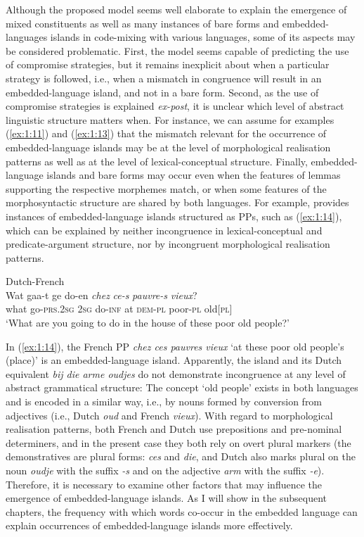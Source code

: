 Although the proposed model seems well elaborate to explain the emergence of mixed constituents as well as many instances of bare forms and embedded-languages islands in code-mixing with various languages, some of its aspects may be considered problematic. First, the model seems capable of predicting the use of compromise strategies, but it remains inexplicit about when a particular strategy is followed, i.e., when a mismatch in congruence will result in an embedded-language island, and not in a bare form. Second, as the use of compromise strategies is explained \textit{ex-post}, it is unclear which level of abstract linguistic structure matters when. For instance, we can assume for examples (\ref{ex:1:11}) and (\ref{ex:1:13}) that the mismatch relevant for the occurrence of embedded-language islands may be at the level of morphological realisation patterns as well as at the level of lexical-conceptual structure. Finally, embedded-language islands and bare forms may occur even when the features of lemmas supporting the respective morphemes match, or when some features of the morphosyntactic structure are shared by both languages. For example, \citet{treffers-daller-mixing-1994} provides instances of embedded-language islands structured as PPs, such as (\ref{ex:1:14}), which can be explained by neither incongruence in lexical-conceptual and predicate-argument structure, nor by incongruent morphological realisation patterns.

\ea \label{ex:1:14}
Dutch-French \citep[208]{treffers-daller-mixing-1994}\\
\gll Wat gaa-t ge do-en \textit{chez} \textit{ce-s} \textit{pauvre-s} \textit{vieux}?\\
	what go-\textsc{prs.2sg} \textsc{2sg} do-\textsc{inf} at \textsc{dem-pl} poor-\textsc{pl} old[\textsc{pl}]\\
\glt `What are you going to do in the house of these poor old people?'
\z

\noindent In (\ref{ex:1:14}), the French PP \textit{chez ces pauvres vieux} `at these poor old people's (place)' is an embedded-language island. Apparently, the island and its Dutch equivalent \textit{bij die arme oudjes} do not demonstrate incongruence at any level of abstract grammatical structure: The concept `old people' exists in both languages and is encoded in a similar way, i.e., by nouns formed by conversion from adjectives (i.e., Dutch \textit{oud} and French \textit{vieux}). With regard to morphological realisation patterns, both French and Dutch use prepositions and pre-nominal determiners, and in the present case they both rely on overt plural markers (the demonstratives are plural forms: \textit{ces} and \textit{die}, and Dutch also marks plural on the noun \textit{oudje} with the suffix \textit{-s} and on the adjective \textit{arm} with the suffix \textit{-e}). Therefore, it is necessary to examine other factors that may influence the emergence of embedded-language islands. As I will show in the subsequent chapters, the frequency with which words co-occur in the embedded language can explain occurrences of embedded-language islands more effectively.

